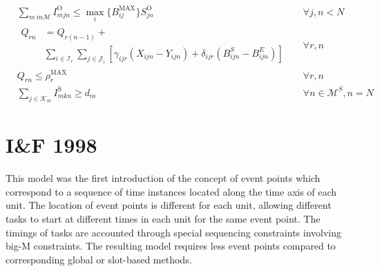 \begin{align}
&\sum_{m \ in \mathcal{M}} I_{mjn}^\text{O} \le \max_i \{B_{ij}^{\text{MAX}}\} S_{jn}^\text{O} && \forall j, n < N \\
&\begin{aligned}
Q_{rn} &= Q_{r(n-1)} +\\ &\sum_{i \in \mathcal{I}_r} \sum_{j \in \mathcal{J}_i} [\gamma_{ijr} (X_{ijn} - Y_{ijn}) + \delta_{ijr} (B_{ijn}^S - B_{ijn}^E)] 
\end{aligned}&& \forall r, n \\
&Q_{rn} \le \rho_r^\text{MAX} &&\forall r, n \\
&\sum_{j \in \mathcal{K}_m} I_{mkn}^\text{S} \ge d_m &&\forall n \in \mathcal{M}^S, n = N
\end{align}

\section{I\&F 1998}
This model \citep{Ierapetritou} was the first introduction of the concept of event points which correspond to a sequence of time instances located along the time axis of each unit. The location of event points is different for each unit, allowing different tasks to start at different times in each unit for the same event point. The timings of tasks are accounted through special sequencing constraints involving big-M constraints. The resulting model requires less event points compared to corresponding global or slot-based methods. 
